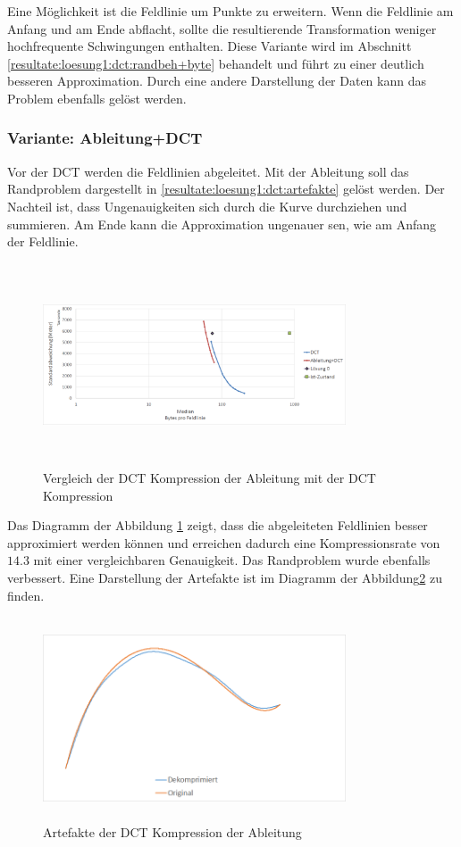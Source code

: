 Eine Möglichkeit ist die Feldlinie um Punkte zu erweitern. Wenn die Feldlinie am Anfang und am Ende abflacht, sollte die resultierende Transformation weniger hochfrequente Schwingungen enthalten. Diese Variante wird im Abschnitt \ref{resultate:loesung1:dct:randbeh+byte} behandelt und führt zu einer deutlich besseren Approximation. Durch eine andere Darstellung der Daten kann das Problem ebenfalls gelöst werden.

\subsubsection{Variante: Ableitung+DCT}\label{resultate:dct:ableitung_dct}
Vor der DCT werden die Feldlinien abgeleitet. Mit der Ableitung soll das Randproblem dargestellt in \ref{resultate:loesung1:dct:artefakte} gelöst werden. Der Nachteil ist, dass Ungenauigkeiten sich durch die Kurve durchziehen und summieren. Am Ende kann die Approximation ungenauer sen, wie am Anfang der Feldlinie.\\
\begin{figure}[!htbp]
	\center
	\includegraphics[width=0.8\textwidth,height=6cm,keepaspectratio]{./pictures/resultate/loesung1/loesung1-1/loesung1_1.png}
	\caption{Vergleich der DCT Kompression der Ableitung mit der DCT Kompression}
	\label{resultate:loesung1:dct_ableitung:resultate}
\end{figure}
Das Diagramm der Abbildung \ref{resultate:loesung1:dct_ableitung:resultate} zeigt, dass die abgeleiteten Feldlinien besser approximiert werden können und erreichen dadurch eine Kompressionsrate von $14.3$ mit einer vergleichbaren Genauigkeit. Das Randproblem wurde ebenfalls verbessert. Eine Darstellung der Artefakte ist im Diagramm der Abbildung\ref{resultate:loesung1:dct:byte:artefakte} zu finden.\\
\begin{figure}[!htbp]
	\center
	\includegraphics[width=0.8\textwidth,height=6cm,keepaspectratio]{./pictures/resultate/loesung1/loesung1-6/artefakte.png}
	\caption{Artefakte der DCT Kompression der Ableitung}
	\label{resultate:loesung1:dct:byte:artefakte}
\end{figure} 

